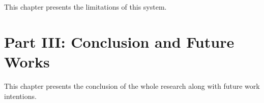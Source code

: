   \vspace{1mm}

\noindent  This chapter presents the limitations of this system.

\section*{Part III: Conclusion and Future Works}

  \vspace{1mm}

\noindent  This chapter presents the conclusion of the whole research along with future work intentions.